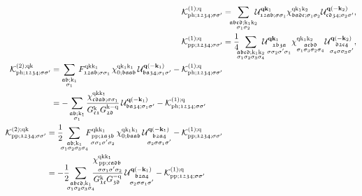 \documentclass[\main/main.tex]{subfiles}
\begin{document}
\begin{align}
 	\mathcal{K}^{(1);\q}_{\ph;\mathfrak{1234};\ss'}&=\!\!\!\sum_{\substack{\mathfrak{abcd};\k_1\k_2\\\sigma_1\sigma_2}} \!\!\!\mathcal{U}^{\vv{q}\vv{k}_1}_{\mathfrak{12ab};\ss_1}\chi^{\q\k_1\k_2}_{\mathfrak{badc};\sigma_1\sigma_2}\mathcal{U}^{\vv{q}(-\vv{k}_2)}_{\mathfrak{cd34};\sigma_2\sigma'},\label{eq:kernel_1}\\
 	\mathcal{K}^{(1);\q}_{\pp;\mathfrak{1234};\ss'}&=\frac14\!\!\!\sum_{\substack{\mathfrak{abcd};\k_1\k_2\\\sigma_1\sigma_2\sigma_3\sigma_4}} \!\!\!\mathcal{U}^{\vv{q}\vv{k}_1}_{\substack{\mathfrak{1b3a}\\\ss_2\sigma'\sigma_1}}\chi^{\q\k_1\k_2}_{\substack{\mathfrak{acbd}\\\sigma_1\sigma_3\sigma_2\sigma_4}}\mathcal{U}^{\vv{q}(-\vv{k}_2)}_{\substack{\mathfrak{d2c4}\\\sigma_4\sigma\sigma_3\sigma'}},\label{eq:kernel_1_pp}\\
\begin{split}\label{eq:kernel_2}
	\mathcal{K}^{(2);\q\k}_{\ph;\mathfrak{1234};\ss'}&=\sum_{\substack{\mathfrak{ab};\k_1\\\sigma_1}} F^{\q\k\k_1}_{\mathfrak{12ab};\ss_1}\,\chi^{\q\k_1\k_1}_{0;\mathfrak{baab}}\,\mathcal{U}^{\vv{q}(-\vv{k}_1)}_{\mathfrak{ba34};\sigma_1\sigma'}-\mathcal{K}^{(1);\q}_{\ph;\mathfrak{1234};\ss'}\\
	&=-\sum_{\substack{\mathfrak{ab};\k_1\\\sigma_1}} \frac{\chi^{\q\k\k_1}_{\mathfrak{cdab};\ss_1}}{G^{\k}_{\mathfrak{c1}}G^{\k-\q}_{\mathfrak{2d}}}\,\mathcal{U}^{\vv{q}(-\vv{k}_1)}_{\mathfrak{ba34};\sigma_1\sigma'}-\mathcal{K}^{(1);\q}_{\ph;\mathfrak{1234};\ss'}
\end{split}\\
\begin{split}\label{eq:kernel_2_pp}
	\mathcal{K}^{(2);\q\k}_{\pp;\mathfrak{1234};\ss'}&=\frac12\!\!\!\sum_{\substack{\mathfrak{ab};\k_1\\\sigma_1\sigma_2\sigma_3\sigma_4}} \!\!\!F^{\q\k\k_1}_{\substack{\pp;\mathfrak{1a3b}\\\sigma\sigma_1\sigma'\sigma_2}}\,\chi^{\q\k_1\k_1}_{0;\mathfrak{baab}}\,\mathcal{U}^{\vv{q}(-\vv{k}_1)}_{\substack{\mathfrak{b2a4}\\\sigma_2\sigma\sigma_1\sigma'}}-\mathcal{K}^{(1);\q}_{\pp;\mathfrak{1234};\ss'}\\
	&=-\frac12\!\!\!\sum_{\substack{\mathfrak{abcd};\k_1\\\sigma_1\sigma_2\sigma_3\sigma_4}}\!\!\! \frac{\chi^{\q\k\k_1}_{\substack{\pp;\mathfrak{cadb}\\\sigma\sigma_1\sigma'\sigma_2}}}{G^{\k}_{\mathfrak{1c}}G^{-\q}_{\mathfrak{3d}}}\,\mathcal{U}^{\vv{q}(-\vv{k}_1)}_{\substack{\mathfrak{b2a4}\\\sigma_2\sigma\sigma_1\sigma'}}-\mathcal{K}^{(1);\q}_{\pp;\mathfrak{1234};\ss'}
\end{split}
\end{align}
\end{document}
